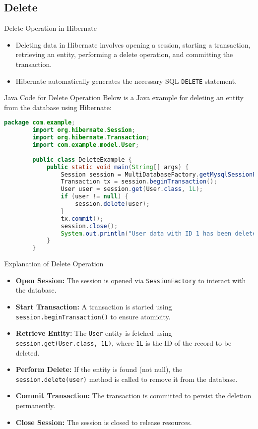 \documentclass[aspectratio=169, table]{beamer}
\begin{document}
\subsection{Delete}

\begin{frame}{Delete Operation in Hibernate}
	\vspace{20pt}
	\begin{itemize}
		\item Deleting data in Hibernate involves opening a session, starting a transaction, retrieving an entity, performing a delete operation, and committing the transaction.
		\item Hibernate automatically generates the necessary SQL \texttt{DELETE} statement.
	\end{itemize}
\end{frame}

\begin{frame}[fragile]{Java Code for Delete Operation}
	\vspace{20pt}
	Below is a Java example for deleting an entity from the database using Hibernate:
	
	\begin{lstlisting}[language=Java, style=JavaStyle]
		package com.example;
		import org.hibernate.Session;
		import org.hibernate.Transaction;
		import com.example.model.User;
		
		public class DeleteExample {
			public static void main(String[] args) {
				Session session = MultiDatabaseFactory.getMysqlSessionFactory().openSession();
				Transaction tx = session.beginTransaction();
				User user = session.get(User.class, 1L);
				if (user != null) {
					session.delete(user);
				}
				tx.commit();
				session.close();
				System.out.println("User data with ID 1 has been deleted.");
			}
		}
	\end{lstlisting}
\end{frame}

\begin{frame}{Explanation of Delete Operation}
	\vspace{20pt}
	\begin{itemize}
		\item \textbf{Open Session:} The session is opened via \texttt{SessionFactory} to interact with the database.
		\item \textbf{Start Transaction:} A transaction is started using \texttt{session.beginTransaction()} to ensure atomicity.
		\item \textbf{Retrieve Entity:} The \texttt{User} entity is fetched using \texttt{session.get(User.class, 1L)}, where \texttt{1L} is the ID of the record to be deleted.
		\item \textbf{Perform Delete:} If the entity is found (not null), the \texttt{session.delete(user)} method is called to remove it from the database.
		\item \textbf{Commit Transaction:} The transaction is committed to persist the deletion permanently.
		\item \textbf{Close Session:} The session is closed to release resources.
	\end{itemize}
\end{frame}
\end{document}
